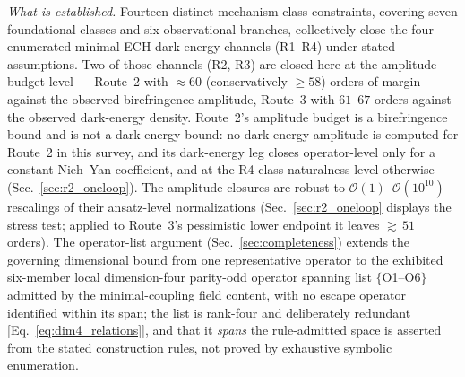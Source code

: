 \documentclass[aps,prd,twocolumn,superscriptaddress,showpacs,preprintnumbers,nofootinbib,longbibliography,floatfix]{revtex4-2}
\begin{document}
\emph{What is established.} Fourteen distinct mechanism-class constraints,
covering seven foundational classes and six observational branches,
collectively close the four enumerated minimal-ECH dark-energy channels
(R1--R4) under stated assumptions. Two of those channels (R2, R3) are
closed here at the amplitude-budget level --- Route~2 with ${\approx}60$
(conservatively $\geq 58$) orders of margin against the observed
birefringence amplitude, Route~3 with $61$--$67$ orders against the
observed dark-energy density. Route~2's amplitude budget is a
birefringence bound and is not a dark-energy bound: no dark-energy
amplitude is computed for Route~2 in this survey, and its dark-energy leg
closes operator-level only for a constant Nieh--Yan coefficient, and at
the R4-class naturalness level otherwise
(Sec.~\ref{sec:r2_oneloop}). The amplitude closures are robust to
$\mathcal{O}(1)$--$\mathcal{O}(10^{10})$
rescalings of their ansatz-level normalizations (Sec.~\ref{sec:r2_oneloop}
displays the stress test; applied to Route~3's pessimistic lower endpoint
it leaves ${\gtrsim}\,51$ orders). The
operator-list
argument (Sec.~\ref{sec:completeness}) extends the governing dimensional bound
from one representative operator to the exhibited six-member local
dimension-four parity-odd operator spanning list $\{$O1--O6$\}$ admitted
by the
minimal-coupling field content, with no escape operator identified within
its span; the list is rank-four and deliberately redundant
[Eq.~\eqref{eq:dim4_relations}], and that it \emph{spans} the
rule-admitted space is asserted from the stated
construction rules, not proved by exhaustive symbolic enumeration.
\end{document}
